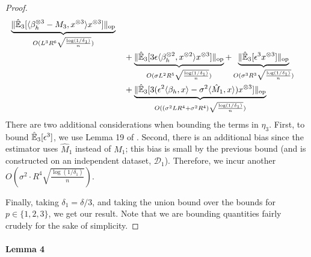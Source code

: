 \documentclass[tablecaption=bottom]{jmlr}
\newcommand\sD{\ensuremath{\mathcal{D}}}
\newcommand\op{{\textrm{op}}}
\begin{document}
\begin{proof}
{\begin{align*}
            \underbrace{ \|\hat\E_3[\innerp{\beta_h\tp{3} - M_3}{x\tp{3}}                      x\tp{3}]\|_\op }_{O( L^3 R^6        \sqrt{\frac{\log(1/\delta_1)}{n}} ) } \\
   &\quad + \underbrace{ \|\hat\E_3[3 \epsilon \innerp{\beta_h\tp{2}}{x\tp{2}}                 x\tp{3}]\|_\op }_{O( \sigma L^2 R^5 \sqrt{\frac{\log(1/\delta_1)}{n}} ) } 
          + \underbrace{ \|\hat\E_3[\epsilon^3                                                 x\tp{3}]\|_\op }_{O( \sigma^3 R^3   \sqrt{\frac{\log (1/\delta_1)}{n}} ) } \\
   &\quad + \underbrace{ \|\hat\E_3[3(\epsilon^2 \innerp{\beta_h}{x} -\sigma^2 \innerp{\hat M_1}{x}) x\tp{3}]\|_\op }_{O( (\sigma^2 L R^4 + \sigma^2 R^4) \sqrt{\frac{\log(1/\delta_1)}{n}} ) } \\
\end{align*}
}
There are two additional considerations when bounding the terms in $\eta_3$.
First, to bound $\hat{\operatorname{\mathbb{E}}}_3[\epsilon^3]$, we use Lemma 19 of \cite{hsu13spherical}.
Second, there is an additional bias since the estimator uses $\hat M_1$ instead of $M_1$; this bias is small by the previous bound (and is constructed on an independent dataset, $\sD_1$).
Therefore, we incur another $O(\sigma^2 \cdot R^4 \sqrt{\frac{\log(1/\delta_1)}{n}})$.

Finally, taking $\delta_1 = \delta/3$, and taking the union bound over the bounds for $p \in \{1,2,3\}$,
we get our result.
Note that we are bounding quantities fairly crudely for the sake of simplicity.
\end{proof}

\paragraph{Lemma 4}
\end{document}
